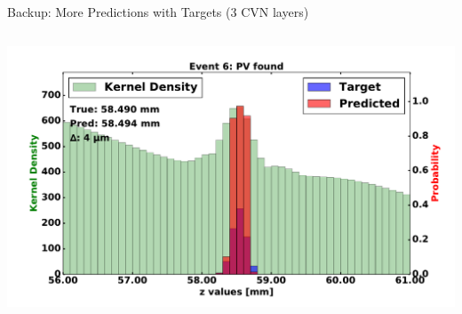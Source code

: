 \begin{frame}{Backup: More Predictions with Targets (3 CVN layers)}
\begin{columns}[c]
\begin{center}
           \includegraphics[width=1\textwidth, height=0.45\textwidth, trim=18 0 18 0]{images/120000_3layer_39.pdf}
       \end{center}
  \end{columns}
\end{frame}

